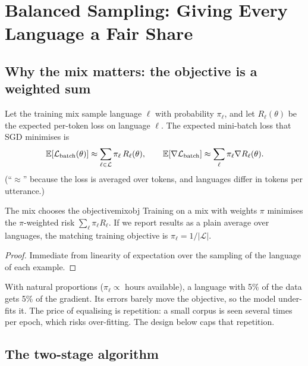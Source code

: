 \chapter{Balanced Sampling: Giving Every Language a Fair Share}
\label{ch:balance}

\section{Why the mix matters: the objective is a weighted sum}

Let the training mix sample language $\ell$ with probability $\pi_\ell$, and let $R_\ell(\theta)$ be the expected per-token loss on
language $\ell$. The expected mini-batch loss that SGD minimises is
\[
\mathbb{E}[\mathcal L_{\text{batch}}(\theta)]\approx\sum_{\ell\in\mathcal L}\pi_\ell\,R_\ell(\theta),
\qquad
\mathbb{E}[\nabla\mathcal L_{\text{batch}}]\approx\sum_\ell\pi_\ell\nabla R_\ell(\theta).
\]
(``$\approx$'' because the loss is averaged over tokens, and languages differ in tokens per utterance.)

\begin{proposition}{The mix chooses the objective}{mixobj}
Training on a mix with weights $\pi$ minimises the $\pi$-weighted risk $\sum_\ell\pi_\ell R_\ell$. If we report results as a plain
average over languages, the matching training objective is $\pi_\ell=1/|\mathcal L|$.
\end{proposition}
\begin{proof}
Immediate from linearity of expectation over the sampling of the language of each example.
\end{proof}

With natural proportions ($\pi_\ell\propto$ hours available), a language with 5\% of the data gets 5\% of the gradient. Its errors
barely move the objective, so the model under-fits it. The price of equalising is repetition: a small corpus is seen several times
per epoch, which risks over-fitting. The design below caps that repetition.

\section{The two-stage algorithm}

